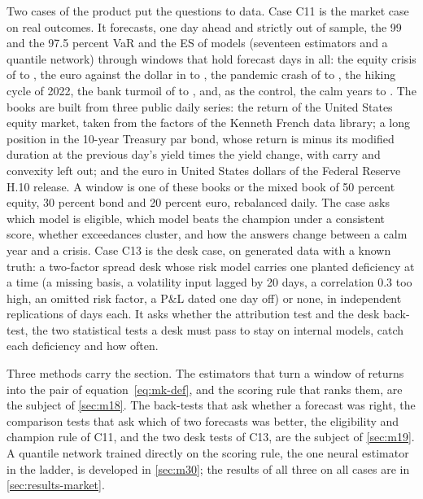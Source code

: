 Two cases of the product put the questions to data. Case C11 is the market case on real outcomes. It forecasts, one day ahead and
strictly out of sample, the 99 and the 97.5 percent VaR and the ES of \mkNModels{} models (seventeen estimators and a quantile network)
through \mkNWindows{} windows that hold \mkTotalDays{} forecast days in all: the equity crisis of \mkStartGfc{} to \mkEndGfc{}, the
euro against the dollar in \mkStartFx{} to \mkEndFx{}, the pandemic crash of \mkStartCovid{} to \mkEndCovid{}, the hiking cycle of
2022, the bank turmoil of \mkStartMixed{} to \mkEndMixed{}, and, as the control, the calm years \mkStartCalm{} to \mkEndCalm{}. The
books are built from three public daily series: the return of the United States equity market, taken from the factors of the Kenneth
French data library; a long position in the 10-year Treasury par bond, whose return is minus its modified duration at the previous
day's yield times the yield change, with carry and convexity left out; and the euro in United States dollars of the Federal Reserve H.10
release. A window is one of these books or the mixed book of 50 percent equity, 30 percent bond and 20 percent euro, rebalanced daily.
The case asks which model is eligible, which model beats the champion under a consistent score, whether exceedances cluster, and how
the answers change between a calm year and a crisis. Case C13 is the desk case, on generated data with a known truth: a two-factor
spread desk whose risk model carries one planted deficiency at a time (a missing basis, a volatility input lagged by 20 days, a
correlation 0.3 too high, an omitted risk factor, a P\&L dated one day off) or none, in \mkCRep{} independent replications of
\mkCWin{} days each. It asks whether the attribution test and the desk back-test, the two statistical tests a desk must pass to stay on
internal models, catch each deficiency and how often.

Three methods carry the section. The estimators that turn a window of returns into the pair of equation~\eqref{eq:mk-def}, and the
scoring rule that ranks them, are the subject of \cref{sec:m18}. The back-tests that ask whether a forecast was right, the comparison
tests that ask which of two forecasts was better, the eligibility and champion rule of C11, and the two desk tests of C13, are the
subject of \cref{sec:m19}. A quantile network trained directly on the scoring rule, the one neural estimator in the ladder, is
developed in \cref{sec:m30}; the results of all three on all cases are in \cref{sec:results-market}.

